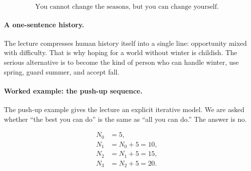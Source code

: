 \begin{equation}
\text{You cannot change the seasons, but you can change yourself.}
\end{equation}

\begin{figure}
\centering
{}
\end{figure}

\paragraph{A one-sentence history.}
The lecture compresses human history itself into a single line: opportunity mixed with difficulty. That is why hoping for a world without winter is childish. The serious alternative is to become the kind of person who can handle winter, use spring, guard summer, and accept fall.

\paragraph{Worked example: the push-up sequence.}
The push-up example gives the lecture an explicit iterative model. We are asked whether ``the best you can do'' is the same as ``all you can do.'' The answer is no.

\begin{align}
N_0 &= 5, \\
N_1 &= N_0+5 = 10, \\
N_2 &= N_1+5 = 15, \\
N_3 &= N_2+5 = 20.
\end{align}

